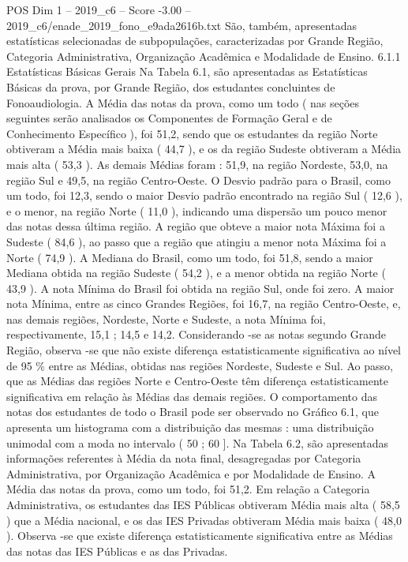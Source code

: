 \begin{textsample}{POS Dim 1 – 2019\_c6 – Score -3.00 – 2019\_c6/enade\_2019\_fono\_e9ada2616b.txt}
São, também, apresentadas estatísticas selecionadas de subpopulações, caracterizadas por Grande Região, Categoria Administrativa, Organização Acadêmica e Modalidade de Ensino. 6.1.1 Estatísticas Básicas Gerais Na Tabela 6.1, são apresentadas as Estatísticas Básicas da prova, por Grande Região, dos estudantes concluintes de Fonoaudiologia.
A Média das notas da prova, como um todo ( nas seções seguintes serão analisados os Componentes de Formação Geral e de Conhecimento Específico ), foi 51,2, sendo que os estudantes da região Norte obtiveram a Média mais baixa ( 44,7 ), e os da região Sudeste obtiveram a Média mais alta ( 53,3 ).
As demais Médias foram : 51,9, na região Nordeste, 53,0, na região Sul e 49,5, na região Centro-Oeste.
O Desvio padrão para o Brasil, como um todo, foi 12,3, sendo o maior Desvio padrão encontrado na região Sul ( 12,6 ), e o menor, na região Norte ( 11,0 ), indicando uma dispersão um pouco menor das notas dessa última região.
A região que obteve a maior nota Máxima foi a Sudeste ( 84,6 ), ao passo que a região que atingiu a menor nota Máxima foi a Norte ( 74,9 ).
A Mediana do Brasil, como um todo, foi 51,8, sendo a maior Mediana obtida na região Sudeste ( 54,2 ), e a menor obtida na região Norte ( 43,9 ).
A nota Mínima do Brasil foi obtida na região Sul, onde foi zero.
A maior nota Mínima, entre as cinco Grandes Regiões, foi 16,7, na região Centro-Oeste, e, nas demais regiões, Nordeste, Norte e Sudeste, a nota Mínima foi, respectivamente, 15,1 ; 14,5 e 14,2.
Considerando -se as notas segundo Grande Região, observa -se que não existe diferença estatisticamente significativa ao nível de 95 \% entre as Médias, obtidas nas regiões Nordeste, Sudeste e Sul.
Ao passo, que as Médias das regiões Norte e Centro-Oeste têm diferença estatisticamente significativa em relação às Médias das demais regiões.
O comportamento das notas dos estudantes de todo o Brasil pode ser observado no Gráfico 6.1, que apresenta um histograma com a distribuição das mesmas : uma distribuição unimodal com a moda no intervalo ( 50 ; 60 ].
Na Tabela 6.2, são apresentadas informações referentes à Média da nota final, desagregadas por Categoria Administrativa, por Organização Acadêmica e por Modalidade de Ensino.
A Média das notas da prova, como um todo, foi 51,2.
Em relação a Categoria Administrativa, os estudantes das IES Públicas obtiveram Média mais alta ( 58,5 ) que a Média nacional, e os das IES Privadas obtiveram Média mais baixa ( 48,0 ).
Observa -se que existe diferença estatisticamente significativa entre as Médias das notas das IES Públicas e as das Privadas.

\end{textsample}
